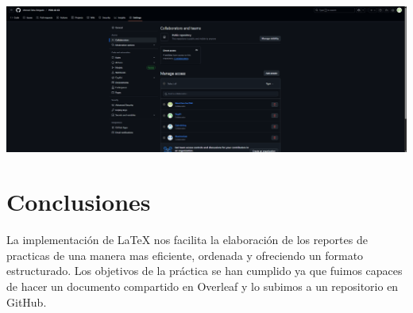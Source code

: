 \documentclass[letterpaper,12pt]{article}
\begin{document}
\begin{center}
    \includegraphics[width=14cm]{Colaboradores.png}
    \caption{}
\end{center}


\section{Conclusiones}
La implementación de LaTeX nos facilita la elaboración de los reportes de practicas de una manera mas eficiente, ordenada y ofreciendo un formato estructurado. Los objetivos de la práctica se han cumplido ya que fuimos capaces de hacer un documento compartido en Overleaf y lo subimos a un repositorio en GitHub.
\end{document}
